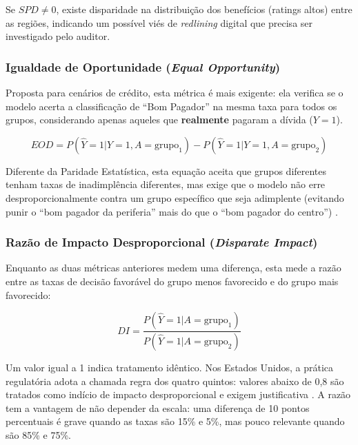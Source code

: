Se $SPD \neq 0$, existe disparidade na distribuição dos benefícios (ratings altos) entre as regiões, indicando um possível viés de \textit{redlining} digital que precisa ser investigado pelo auditor.

\subsubsection{Igualdade de Oportunidade (\textit{Equal Opportunity})}
Proposta para cenários de crédito, esta métrica é mais exigente: ela verifica se o modelo acerta a classificação de ``Bom Pagador'' na mesma taxa para todos os grupos, considerando apenas aqueles que \textbf{realmente} pagaram a dívida ($Y=1$).

\begin{equation}
    EOD = P(\hat{Y}=1 | Y=1, A=\text{grupo}_1) - P(\hat{Y}=1 | Y=1, A=\text{grupo}_2)
\end{equation}

Diferente da Paridade Estatística, esta equação aceita que grupos diferentes tenham taxas de inadimplência diferentes, mas exige que o modelo não erre desproporcionalmente contra um grupo específico que seja adimplente (evitando punir o ``bom pagador da periferia'' mais do que o ``bom pagador do centro'') \cite{hardtEqualityOpportunitySupervised2016, barocasBigDataDisparate2016}.

\subsubsection{Razão de Impacto Desproporcional (\textit{Disparate Impact})}
Enquanto as duas métricas anteriores medem uma diferença, esta mede a razão entre as taxas de decisão favorável do grupo menos favorecido e do grupo mais favorecido:

\begin{equation}
    DI = \frac{P(\hat{Y}=1 | A=\text{grupo}_1)}{P(\hat{Y}=1 | A=\text{grupo}_2)}
\end{equation}

Um valor igual a 1 indica tratamento idêntico. Nos Estados Unidos, a prática regulatória adota a chamada regra dos quatro quintos: valores abaixo de 0,8 são tratados como indício de impacto desproporcional e exigem justificativa \cite{feldmanCertifyingRemovingDisparate2015}. A razão tem a vantagem de não depender da escala: uma diferença de 10 pontos percentuais é grave quando as taxas são 15\% e 5\%, mas pouco relevante quando são 85\% e 75\%.

